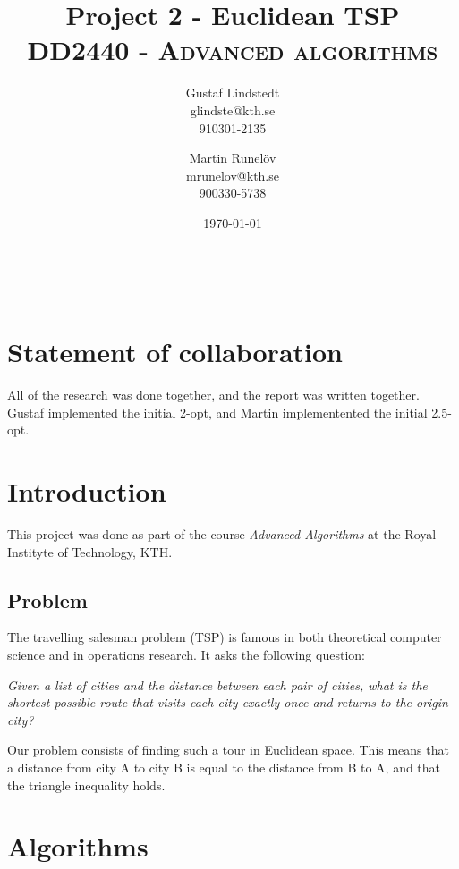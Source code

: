 \documentclass[paper=a4, fontsize=11pt,numbers=endperiod]{scrartcl} %
\title{ 
\huge Project 2 - Euclidean TSP \\ %
\vspace{10pt}
\normalfont \normalsize 
\textsc{DD2440 - Advanced algorithms } \\ [25pt] %
}
\author{Gustaf Lindstedt \\ glindste@kth.se \\ 910301-2135 \and Martin Runelöv \\ mrunelov@kth.se \\ 900330-5738}
\date{\vspace{8pt}\normalsize\today} %
\numberwithin{equation}{section} %
\numberwithin{figure}{section} %
\numberwithin{table}{section} %
\begin{document}
\maketitle %


\hspace{0pt}\\
\section*{Statement of collaboration}
All of the research was done together, and the report was written together.
Gustaf implemented the initial 2-opt, and Martin implementented the initial 2.5-opt.

\section{Introduction}

This project was done as part of the course \emph{Advanced Algorithms} at the Royal Instityte of Technology, KTH.

\subsection{Problem}

The travelling salesman problem (TSP) is famous in both theoretical computer science and in operations research. It asks the following question: 

\begin{center}
    \emph{Given a list of cities and the distance between each pair of cities, what is the shortest possible route that visits each city exactly once and returns to the origin city?}
\end{center}

Our problem consists of finding such a tour in Euclidean space. This means that a distance from city A to city B is equal to the distance from B to A, and that the triangle inequality holds.

\section{Algorithms}
\end{document}
